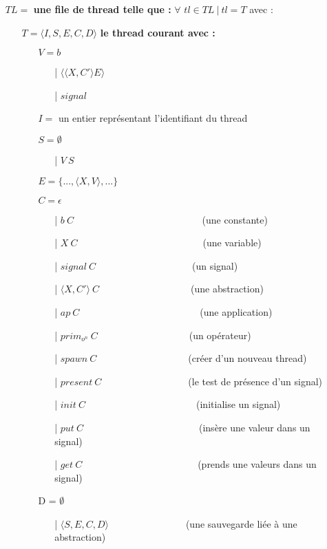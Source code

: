 \documentclass[10pt,a4paper]{article}
\begin{document}
				\begin{itemize}
					\item[] $TL =$ \textbf{une file de thread telle que :} $\forall$ $tl \in TL~|~tl = T$ avec :
					\begin{itemize}
					  \item[] $T = \langle I,S,E,C,D\rangle$ \textbf{le thread courant avec :}
					  \begin{itemize}
					  	\item[] $V = b$	
					  	\begin{itemize}
					  		\item[|] $\langle\langle X,C' \rangle E\rangle$
					  		\item[|] $signal$
					  	\end{itemize}
					  	\item[] $I =$ un entier représentant l'identifiant du thread
					  	\item[] $S =  \emptyset$ 
					  	\begin{itemize}
					  		\item[|] $V~S$
					  	\end{itemize}
					  	\item[] $E = \{...,\langle X,V\rangle,...\}$
					  	\item[] $C = \epsilon$
					  	\begin{itemize}
					  		\item[|] $b~C$~~~~~~~~~~~~~~~~~~~~~~~~~~    (une constante)
					  		\item[|] $X~C$~~~~~~~~~~~~~~~~~~~~~~~~~~(une variable)
					  		\item[|] $signal~C$~~~~~~~~~~~~~~~~~~~~(un signal)
					  		\item[|] $\langle X,C'\rangle~C$~~~~~~~~~~~~~~~~~~~(une abstraction)
					  		\item[|] $ap~C$~~~~~~~~~~~~~~~~~~~~~~~~~(une application)
					  		\item[|] $prim_{o^{n}}~C$~~~~~~~~~~~~~~~~~~~(un opérateur)
					  		\item[|] $spawn~C$~~~~~~~~~~~~~~~~~~~(créer d'un nouveau thread)
					  		\item[|] $present~C$~~~~~~~~~~~~~~~~~~(le test de présence d'un signal)
					  		\item[|] $init~C$~~~~~~~~~~~~~~~~~~~~~~~(initialise un signal)
					  		\item[|] $put~C$~~~~~~~~~~~~~~~~~~~~~~~~(insère une valeur dans un signal)
					  		\item[|] $get~C$~~~~~~~~~~~~~~~~~~~~~~~~(prends une valeurs dans un signal)
					  	\end{itemize}
					  	\item[] D = $\emptyset$
					  	\begin{itemize}
					  		\item[|] $\langle S,E,C,D\rangle$~~~~~~~~~~~~~~~~(une sauvegarde liée à une abstraction)
					  	\end{itemize}
					  \end{itemize}	
					\end{itemize}
					

\end{itemize}
\end{document}
